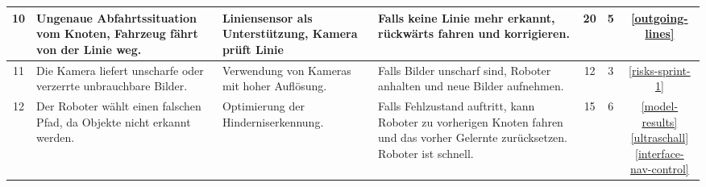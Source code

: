 \begin{table}[H]
\begin{tabularx}{\textwidth}{|c|X|X|X|c|c|c|}
  \hline
      10&Ungenaue Abfahrtssituation vom Knoten, Fahrzeug fährt von der Linie weg. &Liniensensor als Unterstützung, Kamera prüft Linie& Falls keine Linie mehr erkannt, rückwärts fahren und korrigieren.&20&5& \ref{outgoing-lines}\\
  \hline
      11&Die Kamera liefert unscharfe oder verzerrte unbrauchbare Bilder. &Verwendung von Kameras mit hoher Auflösung.&Falls Bilder unscharf sind, Roboter anhalten und neue Bilder aufnehmen.&12&3&\ref{risks-sprint-1} \\
  \hline
        12& Der Roboter wählt einen falschen Pfad, da Objekte nicht erkannt werden. &Optimierung der Hinderniserkennung.& Falls Fehlzustand auftritt, kann Roboter zu vorherigen Knoten fahren und das vorher Gelernte zurücksetzen. Roboter ist schnell.&15& 6&\makecell{\ref{model-results} \\ \ref{ultraschall}\\ \ref{interface-nav-control}}\\
  \hline

\end{tabularx}
\end{table}

\newpage

